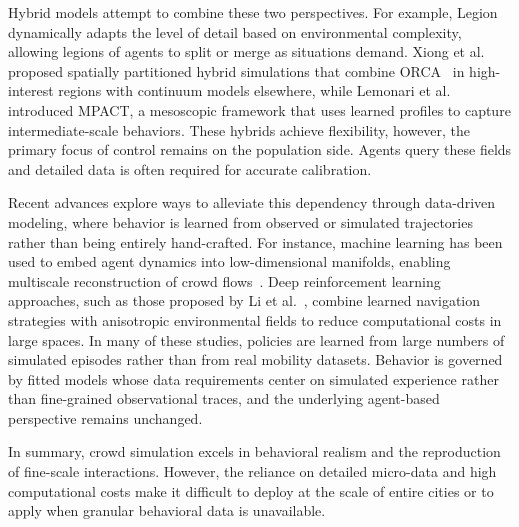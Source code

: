 \documentclass[pdflatex,sn-mathphys-num]{sn-jnl}%
\newcommand\redb[1]{#1}
\theoremstyle{thmstyleone}%
\theoremstyle{thmstyletwo}%
\theoremstyle{thmstylethree}%
\begin{document}
{Hybrid models attempt to combine these two perspectives. For example, Legion\citep{legion} dynamically adapts the level of detail based on environmental complexity, allowing legions of agents to split or merge as situations demand. Xiong et al.~\citep{xiong2010hybrid} proposed spatially partitioned hybrid simulations that combine ORCA~\citep{van2011reciprocal} in high-interest regions with continuum models elsewhere, while Lemonari et al.~\citep{lemonari2025mpact} introduced MPACT, a mesoscopic framework that uses learned profiles to capture intermediate-scale behaviors. \redb{These hybrids achieve flexibility, however, the primary focus of
control remains on the population side. Agents query these fields and detailed data is often required for accurate calibration.}%

\redb{Recent advances explore ways to alleviate this dependency through data-driven modeling, where behavior is learned from observed or simulated trajectories rather than being entirely hand-crafted. For instance, machine learning has been used to embed agent dynamics into low-dimensional manifolds, enabling multiscale reconstruction of crowd flows~\citep{alvarez2025quationfree}. 
Deep reinforcement learning approaches, such as those proposed by Li et al.~\citep{Li2025efficienteCrowdSim}, combine learned navigation strategies with anisotropic environmental fields to reduce computational costs in large spaces. 
In many of these studies, policies are learned from large numbers of simulated episodes rather than from real mobility datasets. Behavior is governed by fitted models whose data requirements center on simulated experience rather than fine-grained observational traces, and the underlying agent-based perspective remains unchanged.}%

In summary, crowd simulation excels in behavioral realism and the reproduction of fine-scale interactions. However, the reliance on detailed micro-data and high computational costs make it difficult to deploy at the scale of entire cities or to apply when granular behavioral data is unavailable.
}
\end{document}
